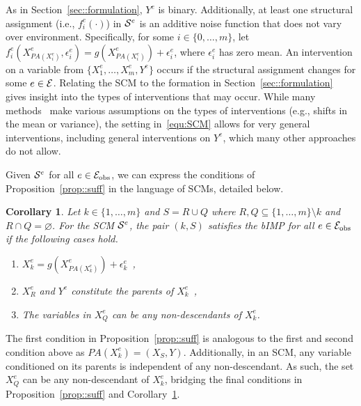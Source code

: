 \documentclass[conference,letterpaper]{IEEEtran}
\newtheorem{corollary}{Corollary}
\begin{document}
As in Section~\ref{sec::formulation}, $Y^e$ is binary. Additionally, at least one structural assignment (i.e., $f_i^e(\cdot)$) in $\mathcal{S}^e$ is an additive noise function that does not vary over environment. Specifically, for some $i\in\{0,\dots,m\}$,  let $f_i^e(X_{PA(X_i^e)}^e,\epsilon^e_i) = g(X_{PA(X_i^e)}^e) + \epsilon^e_i$, where $\epsilon^e_i$ has zero mean. An intervention on a variable from $\{X_1^e,\dots,X_m^e,Y^e\}$ occurs if the structural assignment changes for some $e\in\mathcal{E}$. Relating the SCM to the formation in Section~\ref{sec::formulation} gives insight into the types of interventions that may occur.  While many methods~\cite{peters2016causal,pfister2021stabilizing,du2023learning} make various assumptions on the types of interventions (e.g., shifts in the mean or variance), the setting in~\eqref{equ:SCM} allows for very general interventions, including general interventions on $Y^e$, which many other approaches do not allow. 


Given  $\mathcal{S}^e$ for all $e\in\mathcal{E}_{\text{obs}}$, we can express the conditions of Proposition~\ref{prop::suff} in the language of SCMs, detailed below.

\begin{corollary}\label{cor:causal1}
Let $ k \in \{1,\ldots,m\}$ and $S = R \cup Q$ where $R,Q \subseteq \{1,\ldots,m\} \setminus k$ and $R \cap Q = \varnothing$. For the SCM $\mathcal{S}^e$, the pair $(k,S)$ satisfies the bIMP for all $e\in\mathcal{E}_{\text{obs}}$ if the following cases hold. 
\begin{enumerate}
    \setlength\itemsep{0em}
    \item $X_k^e = g(X^e_{PA(X_k^e)}) + \epsilon^e_k$\ ,
    \item $X_R^e$ and $Y^e$ constitute the parents of $X_k^e$\ ,
    \item The variables in $X_Q^e$ can be any non-descendants of $X_k^e$.
\end{enumerate}
\end{corollary}
The first condition in Proposition~\ref{prop::suff} is analogous to the first and second condition above as $PA(X_k^e) = (X_S,Y)$. Additionally, in an SCM, any variable conditioned on its parents is independent of any non-descendant. As such, the set $X_Q^e$ can be any non-descendant of $X_k^e$, bridging the final conditions in Proposition~\ref{prop::suff} and Corollary~\ref{cor:causal1}. 
\end{document}
